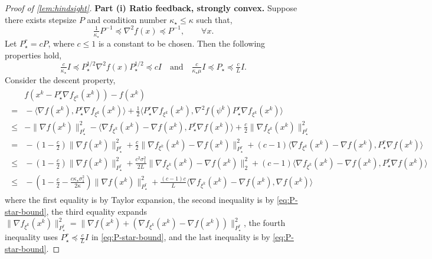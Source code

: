 \documentclass{article}
\theoremstyle{definition}
\begin{document}
\begin{proof}[Proof of \cref{lem:hindsight}]
  \textbf{Part (i) Ratio feedback, strongly convex.} Suppose there exists stepsize $P$ and condition number
  $\kappa_{\star} \leq \kappa$ such that,
  \[ \tfrac{1}{\kappa_{\star}} P^{- 1} \preceq \nabla^2 f (x) \preceq P^{- 1},
     \qquad \forall x. \]
  Let $P^r_{\star} = c P$, where $c \leq 1$ is a constant to be chosen. Then
  the following properties hold,
  \begin{equation}
    \tfrac{c}{\kappa_{\star}} I \preceq P_{\star}^{1 / 2} \nabla^2 f (x)
    P_{\star}^{1 / 2} \preceq c I \quad \text{and} \quad
    \tfrac{c}{\kappa_{\star} \mu} I \preceq P_{\star} \preceq \tfrac{c}{L} I.
    \label{eq:P-star-bound}
  \end{equation}
  Consider the descent property,
  \begin{align}
    \begin{split}\label{eq:hindsight-1} 
      &{} f (x^k - P^r_{\star} \nabla f_{\xi^k} (x^k)) - f (x^k) \\
    =&{} - \langle \nabla f (x^k), P^r_{\star} \nabla f_{\xi^k} (x^k)
    \rangle + \tfrac{1}{2} \langle P^r_{\star} \nabla f_{\xi^k} (x^k),
    \nabla^2 f (\psi^k) P^r_{\star} \nabla f_{\xi^k} (x^k) \rangle \\
    \leq &{} - \| \nabla f (x^k) \|_{P^r_{\star}}^2 - \langle \nabla
    f_{\xi^k} (x^k) - \nabla f (x^k), P^r_{\star} \nabla f (x^k) \rangle +
    \tfrac{c}{2} \| \nabla f_{\xi^k} (x^k) \|_{P^r_{\star}}^2 \\
    = &{} - \left( 1 - \tfrac{c}{2} \right) \| \nabla f (x^k)
    \|_{P^r_{\star}}^2 + \tfrac{c}{2} \| \nabla f_{\xi^k} (x^k) - \nabla f
    (x^k) \|_{P^r_{\star}}^2 + (c - 1) \langle \nabla f_{\xi^k} (x^k) - \nabla
    f (x^k), P^r_{\star} \nabla f (x^k) \rangle \\
    \leq &{} - \left( 1 - \tfrac{c}{2} \right) \| \nabla f (x^k)
    \|_{P^r_{\star}}^2 + \tfrac{c^2 \sigma_1^2}{2 L} \| \nabla f_{\xi^k} (x^k)
    - \nabla f (x^k) \|_2^2 + (c - 1) \langle \nabla f_{\xi^k} (x^k) - \nabla
    f (x^k), P^r_{\star} \nabla f (x^k) \rangle \\
    \leq &{} - \left( 1 - \tfrac{c}{2} - \tfrac{c \kappa_{\star}
    \sigma_1^2}{2 \kappa} \right) \| \nabla f (x^k) \|_{P^r_{\star}}^2 +
    \tfrac{(c - 1) c}{L} \langle \nabla f_{\xi^k} (x^k) - \nabla f (x^k),
    \nabla f (x^k) \rangle 
    \end{split}
  \end{align}
  where the first equality is by Taylor expansion, the second inequality is by
  \eqref{eq:P-star-bound}, the third equality expands $\| \nabla f_{\xi^k}
  (x^k) \|_{P^r_{\star}}^2 = \| \nabla f (x^k) + (\nabla f_{\xi^k} (x^k) -
  \nabla f (x^k)) \|_{P^r_{\star}}^2$, the fourth inequality uses $P^r_{\star}
  \preceq \tfrac{c}{L} I$ in \eqref{eq:P-star-bound}, and the
  last inequality is by \eqref{eq:P-star-bound}.
  

\end{proof}
\end{document}
